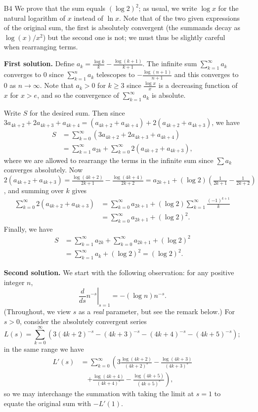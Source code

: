 \documentclass[amssymb,twocolumn,pra,10pt,aps]{revtex4-1}
\begin{document}
\begin{itemize}
\item[B4]
We prove that the sum equals $ (\log 2)^2$;
as usual, we write $\log x$ for the natural logarithm of $x$ instead of $\ln x$.
Note that of the two given expressions of the original sum, the first is absolutely convergent
(the summands decay as $\log(x)/x^2$) but the second one is not; we must thus be slightly careful when rearranging terms.

\noindent
\textbf{First solution.}
Define $a_k = \frac{\log k}{k} - \frac{\log(k+1)}{k+1}$. The infinite sum $\sum_{k=1}^\infty a_k$ converges to $0$ since $\sum_{k=1}^n a_k$ telescopes to $-\frac{\log(n+1)}{n+1}$ and this converges to $0$ as $n\to\infty$. Note that $a_k > 0$ for $k \geq 3$ since $\frac{\log x}{x}$ is a decreasing function of $x$ for $x>e$, and so the convergence of $\sum_{k=1}^\infty a_k$ is absolute.

Write $S$ for the desired sum. Then since $3a_{4k+2}+2a_{4k+3}+a_{4k+4} = (a_{4k+2}+a_{4k+4})+2(a_{4k+2}+a_{4k+3})$, we have
\begin{align*}
S &= \sum_{k=0}^\infty (3a_{4k+2}+2a_{4k+3}+a_{4k+4}) \\
&= \sum_{k=1}^\infty a_{2k}+\sum_{k=0}^\infty 2(a_{4k+2}+a_{4k+3}),
\end{align*}
where we are allowed to rearrange the terms in the infinite sum since $\sum a_k$ converges absolutely. Now
$2(a_{4k+2}+a_{4k+3}) = \frac{\log(4k+2)}{2k+1}-\frac{\log(4k+4)}{2k+2} = a_{2k+1}+(\log 2)(\frac{1}{2k+1}-\frac{1}{2k+2})$, and summing over $k$ gives
\begin{align*}
\sum_{k=0}^\infty 2(a_{4k+2}+a_{4k+3}) &= \sum_{k=0}^\infty a_{2k+1} + (\log 2) \sum_{k=1}^\infty \frac{(-1)^{k+1}}{k}\\
&= \sum_{k=0}^\infty a_{2k+1} +(\log 2)^2.
\end{align*}
Finally, we have 
\begin{align*}
S &= \sum_{k=1}^\infty a_{2k} + \sum_{k=0}^\infty a_{2k+1} +(\log 2)^2 \\
&= \sum_{k=1}^\infty a_k +(\log 2)^2 = (\log 2)^2.
\end{align*}

\noindent
\textbf{Second solution.}
We start with the following observation: for any positive integer $n$,
\[
\left. \frac{d}{ds} n^{-s} \right|_{s=1} = -(\log n)n^{-s}.
\]
(Throughout, we view $s$ as a \emph{real} parameter, but see the remark below.)
For $s>0$, consider the absolutely convergent series
\[
L(s) = \sum_{k=0}^\infty (3 (4k+2)^{-s} - (4k+3)^{-s} - (4k+4)^{-s} - (4k+5)^{-s});
\]
in the same range we have
\begin{align*}
L'(s) &= \sum_{k=0}^\infty \left( 3 \frac{\log(4k+2)}{(4k+2)^s} - \frac{\log(4k+3)}{(4k+3)^s} \right. \\
&\quad \left. + \frac{\log(4k+4)}{(4k+4)^s} - \frac{\log(4k+5)}{(4k+5)^{s}} \right),
\end{align*}
so we may interchange the summation with taking the limit at $s=1$ to equate the original sum with $-L'(1)$.


\end{itemize}
\end{document}
